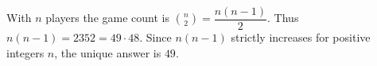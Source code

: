 With $n$ players the game count is $\binom n2=\dfrac{n(n-1)}{2}$. Thus $n(n-1)=2352=49\cdot48$. Since $n(n-1)$ strictly increases for positive integers $n$, the unique answer is $\boxed{49}$.
